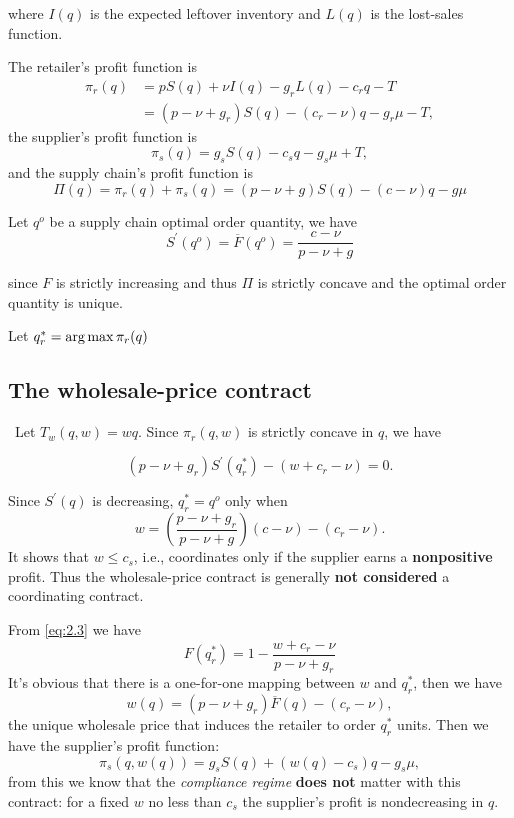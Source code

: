 where $I(q)$ is the expected leftover inventory and $L(q)$ is the lost-sales function.

The retailer's profit function is 
\begin{equation}\label{eq:retailer}\tag{Retailer}
    \begin{aligned}
        \pi_r(q)&=pS(q)+\nu I(q)-g_r L(q)-c_r q - T\\
    &=(p-\nu+g_r)S(q)-(c_r-\nu)q-g_r\mu-T,
    \end{aligned}
\end{equation}
the supplier's profit function is 
\begin{equation}\label{eq:supplier}\tag{Supplier}
    \pi_s(q)=g_s S(q)-c_s q-g_s\mu + T,
\end{equation}
and the supply chain's profit function is 
\begin{equation}\label{eq:2.1}
    \Pi(q)=\pi_r(q)+\pi_s(q)=(p-\nu+g)S(q)-(c-\nu)q-g\mu
\end{equation}

Let $q^o$ be a supply chain optimal order quantity, we have 
\begin{equation}
    S^\prime(q^o)=\overline F(q^o)=\frac{c-\nu}{p-\nu+g}
\end{equation}

since $F$ is strictly increasing and thus $\Pi$ is strictly concave and the optimal order quantity is unique.

Let $q_r^*=\operatorname*{arg\,max} \pi_r(q)$

\subsection{The wholesale-price contract}\
Let $T_w(q,w)=w q$. Since $\pi_r(q,w)$ is strictly concave in $q$, we have 

\begin{equation}\label{eq:2.3}
    (p-\nu+g_r)S^\prime(q_r^*)-(w+c_r-\nu)=0.
\end{equation}

Since $S^\prime(q)$ is decreasing, $q_r^*=q^o$ only when
$$
w=(\frac{p-\nu+g_r}{p-\nu+g})(c-\nu)-(c_r-\nu).
$$
It shows that $w\leq c_s$, i.e., coordinates only if the supplier earns a \textbf{nonpositive} profit. Thus the wholesale-price contract is generally \textbf{not considered} a coordinating contract.

From \autoref{eq:2.3} we have 
$$F(q_r^*)=1-\frac{w+c_r-\nu}{p-\nu+g_r}$$
It's obvious that there is a one-for-one mapping between $w$ and $q_r^*$, then we have $$w(q)=(p-\nu+g_r)\overline{F}(q)-(c_r-\nu),$$
the unique wholesale price that induces the retailer to order $q_r^*$ units.
Then we have the supplier's profit function:
\begin{equation}
    \pi_s(q,w(q))=g_s S(q)+(w(q)-c_s)q-g_s\mu\label{eq:2.4},
\end{equation}
from this we know that the \textit{compliance regime} \textbf{does not} matter with this contract: for a fixed $w$ no less than $c_s$ the supplier's profit  is nondecreasing in $q$.

